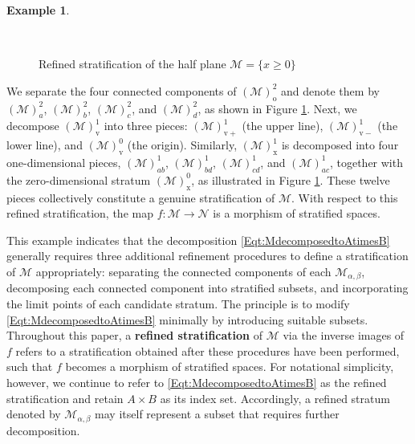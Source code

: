 \documentclass[12pt]{amsart}
\theoremstyle{definition}
\newtheorem{example}[theorem]{Example}
\numberwithin{equation}{section}
\newcommand{\SET}[1]{\{#1\}}
\begin{document}
{\begin{example}
\begin{figure}[htbp]
{
        }
  \caption{Refined stratification of the half plane $\mathcal{M}=\SET{x\geqslant 0}$} \label{Fig:refinedhalfplane}~ 
\end{figure}
 We separate the four connected components of $(\mathcal{M})^2_{\mathrm{o}}$ and denote them by $(\mathcal{M})^2_{a}$, $(\mathcal{M})^2_{b}$, $(\mathcal{M})^2_{c}$, and $(\mathcal{M})^2_{d}$, as shown in Figure \ref{Fig:refinedhalfplane}. Next, we decompose $(\mathcal{M})^1_{\mathrm{v}}$ into three pieces: $(\mathcal{M})^1_{\mathrm{v+}}$ (the upper line), $(\mathcal{M})^1_{\mathrm{v-}}$ (the lower line), and $(\mathcal{M})^0_{\mathrm{v}}$ (the origin). Similarly, $(\mathcal{M})^1_{\mathrm{x}}$ is decomposed into four one-dimensional pieces, $(\mathcal{M})^1_{ab}$, $(\mathcal{M})^1_{bd}$, $(\mathcal{M})^1_{cd}$, and $(\mathcal{M})^1_{ac}$, together with the zero-dimensional stratum $(\mathcal{M})^0_{\mathrm{x}}$, as illustrated in Figure \ref{Fig:refinedhalfplane}. These twelve pieces collectively constitute a genuine stratification of $\mathcal{M}$. With respect to this refined stratification, the map $f:\mathcal{M}\to\mathcal{N}$ is a morphism of stratified spaces.
 
  \end{example}

This example indicates that the decomposition \eqref{Eqt:MdecomposedtoAtimesB} generally requires three additional refinement procedures to define a stratification of $\mathcal{M}$ appropriately: separating the connected components of each $\mathcal{M}_{\alpha,\beta}$, decomposing each connected component into stratified subsets, and incorporating the limit points of each candidate stratum. The principle is to modify \eqref{Eqt:MdecomposedtoAtimesB}   minimally by introducing suitable subsets. Throughout this paper, a \textbf{refined stratification} of $\mathcal{M}$ via the inverse images of $f$ refers to a stratification obtained after these procedures have been performed, such that $f$ becomes a morphism of stratified spaces. For notational simplicity, however, we continue to refer to \eqref{Eqt:MdecomposedtoAtimesB} as the refined stratification and retain $A\times B$ as its index set. Accordingly, a refined stratum denoted by $\mathcal{M}_{\alpha,\beta}$ may itself represent a subset that requires further decomposition.
 
}
\end{document}
